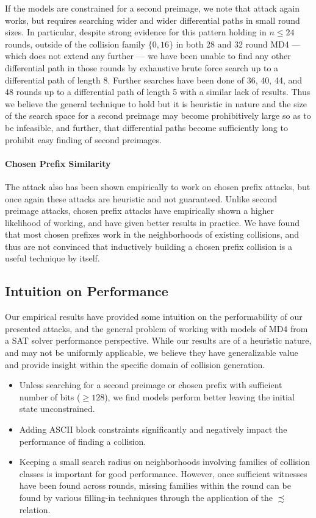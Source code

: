 \documentclass[conference]{IEEEtran}
\begin{document}
If the models are constrained for a second preimage, we note that attack again
works, but requires searching wider and wider differential paths in small round
sizes. In particular, despite strong evidence for this pattern holding in
$n \leq 24$ rounds, outside of the collision family $\{0, 16\}$ in both 28 and
32 round MD4 --- which does not extend any further --- we have been unable to find
any other differential path in those rounds by exhaustive brute force search
up to a differential path of length 8. Further searches have been done of
36, 40, 44, and 48 rounds up to a differential path of length 5 with a similar
lack of results. Thus we believe the general technique to hold but it
is heuristic in nature and the size
of the search space for a second preimage may become prohibitively
large so as to be infeasible, and
further, that differential paths become sufficiently long to prohibit easy
finding of second preimages.

\paragraph{Chosen Prefix Similarity}

The attack also has been shown empirically to work on chosen prefix
attacks, but once again these attacks are heuristic and not
guaranteed.  Unlike second preimage attacks, chosen prefix attacks
have empirically shown a higher likelihood
of working, and have given better results in practice. We have found that most chosen
prefixes work in the neighborhoods of existing collisions, and thus are not
convinced that inductively building a chosen prefix collision is a useful
technique by itself.


\subsection{Intuition on Performance}

Our empirical results have provided some intuition on the
performability of our presented attacks, and the general problem of
working with models of MD4 from a SAT solver
performance perspective.  While our results are of a heuristic nature,
and may not be uniformly applicable, we believe they have
generalizable value and provide insight within the specific domain of
collision generation.

\begin{itemize}
    \item Unless searching for a second preimage or chosen prefix with
        sufficient number of bits ($\geq 128$), we find models perform better
        leaving the initial state unconstrained.
    \item Adding ASCII block constraints significantly and negatively impact
        the performance of finding a collision.
    \item Keeping a small search radius on neighborhoods involving families
        of collision classes is important for good performance. However,
        once sufficient witnesses have been found across rounds, missing
        families within the round can be found by various filling-in
        techniques through the application of the $\precsim$ relation.
\end{itemize}
\end{document}

